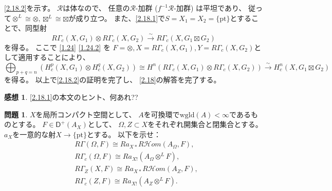 \documentclass[uplatex,dvipdfmx]{jsarticle}
\makeatletter
\theoremstyle{definition}
\newtheorem{prob}[prob]{問題}
\newtheorem*{kansou*}{感想}
\renewenvironment{proof}[1][\proofname]{
  \pushQED{\qed}%
  \normalfont \topsep6\p@\@plus6\p@\relax
  \trivlist
  \item[\hskip\labelsep
    #1\@addpunct{\textbf{.}}]\ignorespaces
}{%
  \popQED\endtrivlist\@endpefalse
}
\providecommand{\proofname}{証明}
\newcommand{\inHom}{\mathcal{H}om}
\newcommand{\sfD}{\mathsf{D}}
\newcommand\mcR{\mathcal{R}}
\newcommand{\wgld}{\mathrm{wgld}}
\makeatother
\begin{document}
\begin{proof}
  \ref{2.18.2}を示す。
  \(\mcR\)は体なので、
  任意の\(\mcR\)-加群 (\(f^{-1}\mcR\)-加群) は平坦であり、
  従って\(\otimes^L\cong \otimes, \boxtimes^L\cong \boxtimes\)が成り立つ。
  また、\ref{2.18.1}で\(S=X_1=X_2=\{\mathrm{pt}\}\)とすることで、同型射
  \[
  R\Gamma_c(X,G_1)\otimes R\Gamma_c(X,G_2) \xrightarrow{\sim}
  R\Gamma_c(X,G_1\boxtimes G_2)
  \]
  を得る。
  ここで \autoref{1.24} \ref{1.24.2} を
  \(F=\otimes, X=R\Gamma_c(X,G_1), Y=R\Gamma_c(X,G_2)\)として適用することにより、
  \[
  \bigoplus_{p+q=n}(H^p_c(X,G_1)\otimes H^q_c(X,G_2))
  \cong H^n(R\Gamma_c(X,G_1)\otimes R\Gamma_c(X,G_2))
  \xrightarrow{\sim} H^n_c(X,G_1\boxtimes G_2)
  \]
  を得る。
  以上で\ref{2.18.2}の証明を完了し、
  \autoref{2.18}の解答を完了する。
\end{proof}

\begin{kansou*}
  \ref{2.18.1}の本文のヒント、何あれ??
\end{kansou*}






\begin{prob}\label{2.19}
  \(X\)を局所コンパクト空間として、
  \(A\)を可換環で\(\wgld(A)<\infty\)であるものとする。
  \(F\in \sfD^+(A_X)\)として、
  \(\Omega,Z\subset X\)をそれぞれ開集合と閉集合とする。
  \(a_X\)を一意的な射\(X\to \{\text{pt}\}\)とする。
  以下を示せ：
  \begin{align}
    &R\Gamma(\Omega,F) \cong Ra_{X*}R\inHom(A_{\Omega},F),
    \label{2.19.1} \\
    &R\Gamma_c(\Omega,F) \cong Ra_{X!}(A_{\Omega}\otimes^L F),
    \label{2.19.2} \\
    &R\Gamma_Z(X,F) \cong Ra_{X*}R\inHom(A_Z,F),
    \label{2.19.3} \\
    &R\Gamma_c(Z,F) \cong Ra_{X!}(A_Z\otimes^L F).
    \label{2.19.4}
  \end{align}
\end{prob}
\end{document}
